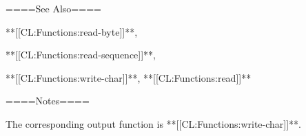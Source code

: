 ====See Also====

**[[CL:Functions:read-byte]]**,

**[[CL:Functions:read-sequence]]**,

**[[CL:Functions:write-char]]**, **[[CL:Functions:read]]**

====Notes====

The corresponding output function is **[[CL:Functions:write-char]]**.

  
